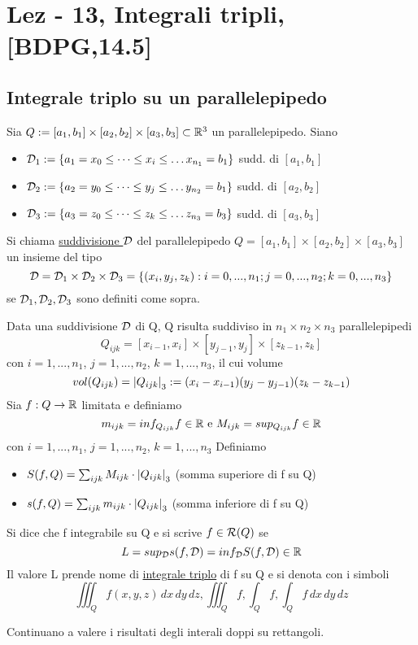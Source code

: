 \section{Lez - 13, Integrali tripli, [BDPG,14.5]}
\subsection{Integrale triplo su un parallelepipedo}
Sia $Q:= [a_1,b_1]\times [a_2,b_2]\times [a_3,b_3]  \subset \mathbb{R}^3$ un parallelepipedo.
Siano
\begin{itemize}
  \item $\mathcal{D}_1 := \{a_1 = x_0 \leq \dots \leq x_i \leq \dots x_{n_1} = b_1\}$ sudd. di $[a_1,b_1]$
  \item $\mathcal{D}_2 := \{a_2 = y_0 \leq \dots \leq y_j \leq \dots y_{n_2} = b_1\}$ sudd. di $[a_2,b_2]$
  \item $\mathcal{D}_3 := \{a_3 = z_0 \leq \dots \leq z_k \leq \dots z_{n_3} = b_3\}$ sudd. di $[a_3,b_3]$
\end{itemize}
\begin{definition}
  Si chiama \underline{suddivisione $\mathcal{D}$} del parallelepipedo $Q=[a_1,b_1]\times [a_2,b_2]\times [a_3,b_3]$
  un insieme del tipo 
  $$\mathcal{D} = \mathcal{D}_1 \times \mathcal{D}_2 \times \mathcal{D}_3 = \{(x_i,y_j,z_k): i = 0,...,n_1; j = 0,...,n_2; k = 0,..., n_3\}$$
  se $\mathcal{D}_1, \mathcal{D}_2, \mathcal{D}_3$ sono definiti come sopra. 
\end{definition}
Data una suddivisione $\mathcal{D}$ di Q, Q risulta suddiviso in $n_1\times n_2 \times n_3$ parallelepipedi
$$Q_{ijk} = [x_{i-1}, x_i]\times [y_{j-1},y_j] \times [z_{k-1},z_k]$$
con $i = 1,..., n_1$, $j = 1,...,n_2$, $k = 1,..., n_3$, il cui volume \ace 
$$vol(Q_{ijk}) = \left\lvert Q_{ijk} \right\rvert_3 := (x_i-x_{i-1})(y_j-y_{j-1})(z_k-z_{k-1})$$
Sia $f : Q \to \mathbb{R}$ limitata e definiamo
$$m_{ijk} = inf_{Q_{ijk}} f \in \mathbb{R} \text{ e } M_{ijk} = sup_{Q_{ijk}} f \in \mathbb{R}$$
con $i = 1,..., n_1$, $j = 1,...,n_2$, $k = 1,..., n_3$
Definiamo 
\begin{itemize}
  \item $S(f,Q) = \sum_{ijk} M_{ijk} \cdot \left\lvert Q_{ijk} \right\rvert_3$ (somma superiore di f su Q)
  \item $s(f,Q) = \sum_{ijk} m_{ijk} \cdot \left\lvert Q_{ijk} \right\rvert_3$ (somma inferiore di f su Q)
\end{itemize}
\begin{definition}
  Si dice che f \ace integrabile su Q e si scrive $f \in \mathcal{R}(Q)$ se 
  $$L = sup_{\mathcal{D}} s(f,\mathcal{D}) = inf_{\mathcal{D}} S(f,\mathcal{D}) \in \mathbb{R}$$
  Il valore L prende nome di \underline{integrale triplo} di f su Q e si denota con i simboli
  $$\iiint_{Q} f(x,y,z) \,dx\,dy\,dz, \iiint_{Q} f, \int_{Q} f, \int_{Q} f \,dx\,dy\,dz$$
\end{definition}
Continuano a valere i risultati degli interali doppi su rettangoli.
